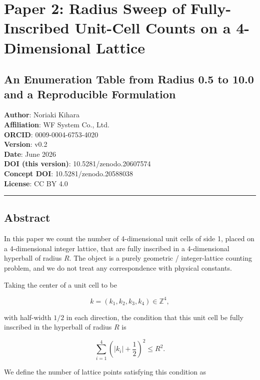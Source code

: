 \documentclass[
]{article}
\author{}
\date{}
\begin{document}
\section{Paper 2: Radius Sweep of Fully-Inscribed Unit-Cell Counts on a
4-Dimensional
Lattice}\label{paper-2-radius-sweep-of-fully-inscribed-unit-cell-counts-on-a-4-dimensional-lattice}

\subsection{An Enumeration Table from Radius 0.5 to 10.0 and a
Reproducible
Formulation}\label{an-enumeration-table-from-radius-0.5-to-10.0-and-a-reproducible-formulation}

\textbf{Author}: Noriaki Kihara\\
\textbf{Affiliation}: WF System Co., Ltd.\\
\textbf{ORCID}: 0009-0004-6753-4020\\
\textbf{Version}: v0.2\\
\textbf{Date}: June 2026\\
\textbf{DOI (this version)}: 10.5281/zenodo.20607574\\
\textbf{Concept DOI}: 10.5281/zenodo.20588038\\
\textbf{License}: CC BY 4.0

\begin{center}\rule{0.5\linewidth}{0.5pt}\end{center}

\subsection{Abstract}\label{abstract}

In this paper we count the number of 4-dimensional unit cells of side 1,
placed on a 4-dimensional integer lattice, that are fully inscribed in a
4-dimensional hyperball of radius \(R\). The object is a purely
geometric / integer-lattice counting problem, and we do not treat any
correspondence with physical constants.

Taking the center of a unit cell to be

\[
k=(k_1,k_2,k_3,k_4)\in\mathbb{Z}^4 ,
\]

with half-width \(1/2\) in each direction, the condition that this unit
cell be fully inscribed in the hyperball of radius \(R\) is

\[
\sum_{i=1}^{4}
\left(|k_i|+\frac12\right)^2
\le R^2 .
\]

We define the number of lattice points satisfying this condition as
\end{document}
